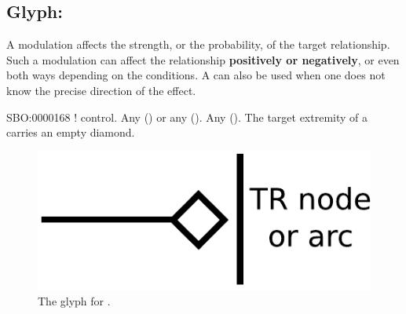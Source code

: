 \color{blue}
\subsection{Glyph: }\label{sec:modulation}

A modulation affects the strength, or the probability, of the target relationship. Such a modulation can affect the
relationship \textbf{positively or negatively}, or even both ways depending on the conditions. A  can also be used when one does not know the precise direction of the effect.

\begin{glyphDescription}
 \glyphSboTerm SBO:0000168 ! control.
 \glyphOrigin Any  () or any  ().
 \glyphTarget Any  ().
 \glyphEndPoint The target extremity of a  carries an empty diamond.
 \end{glyphDescription}

\begin{figure}[H]
  \centering
  \includegraphics[scale = 0.5]{images/modulation}
  \caption{The \ER glyph for .}
  \label{fig:modulation}
\end{figure}
 
% 


